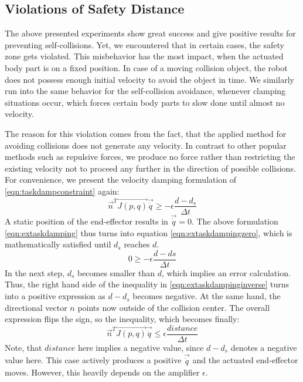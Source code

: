 \subsection{Violations of Safety Distance}
The above presented experiments show great success and give positive results for preventing self-collisions. Yet, we encountered that in certain cases, the safety zone gets violated. This misbehavior has the most impact, when the actuated body part is on a fixed position. In case of a moving collision object, the robot does not possess enough initial velocity to avoid the object in time. We similarly run into the same behavior for the self-collision avoidance, whenever clamping situations occur, which forces certain body parts to slow done until almost no velocity. 

The reason for this violation comes from the fact, that the applied method for avoiding collisions does not generate any velocity. In contrast to other popular methods such as repulsive forces, we produce no force rather than restricting the existing velocity not to proceed any further in the direction of possible collisions. For convenience, we present the velocity damping formulation of \ref{eqn:taskdampconstraint} again:
\begin{equation}\label{eqn:extaskdamping}
\vec{n}^T\vec{J(p,q)} \vec{\dot{q}} \geq - \epsilon \frac{d - d_s}{\Delta t} 
\end{equation}
A static position of the end-effector results in $\vec{\dot{q}} = 0$. The above formulation \ref{eqn:extaskdamping} thus turns into equation \ref{eqn:extaskdampingzero}, which is mathematically satisfied until $d_s$ reaches $d$. 
\begin{equation}\label{eqn:extaskdampingzero}
0 \geq - \epsilon \frac{d - ds}{\Delta t} 
\end{equation}
In the next step, $d_s$ becomes smaller than $d$, which implies an error calculation. Thus, the right hand side of the inequality in \ref{eqn:extaskdampinginverse} turns into a positive expression as $d - d_s$ becomes negative. At the same hand, the directional vector $n$ points now outside of the collision center. The overall expression flips the sign, so the inequality, which becomes finally:
\begin{equation}\label{eqn:extaskdampinginverse}
\vec{n}^T\vec{J(p,q)} \vec{\dot{q}} \leq  \epsilon \frac{\mathit{distance}}{\Delta t} 
\end{equation}
Note, that $distance$ here implies a negative value, since $d-d_s$ denotes a negative value here. This case actively produces a positive $\vec{\dot{q}}$ and the actuated end-effector moves. However, this heavily depends on the amplifier $\epsilon$. 
